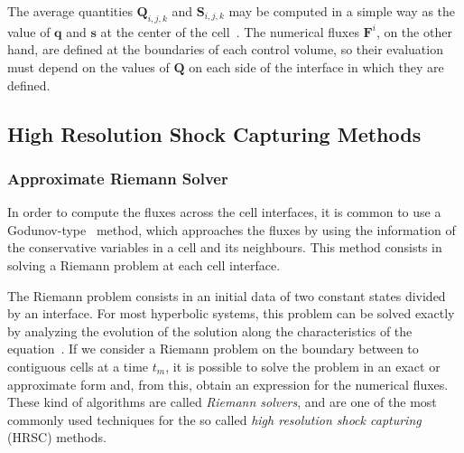 
The average quantities $\mathbf{Q}_{i,j,k}$ and $\mathbf{S}_{i,j,k}$ may be computed in a simple way as the value of $\mathbf{q}$ and $\mathbf{s}$ at the center of the cell~\citep{leveque2002}. The numerical fluxes $\mathbf{{F}}^i$, on the other hand, are defined at the boundaries of each control volume, so their evaluation must depend on the values of $\mathbf{Q}$ on each side of the interface in which they are defined.


\subsection{High Resolution Shock Capturing Methods}
\label{susec:HRSC}


\subsubsection{Approximate Riemann Solver}
\label{subsubsec:riemann_solver}

In order to compute the fluxes across the cell interfaces, it is common to use a Godunov-type~\citep{godunov1959} method, which approaches the fluxes by using the information of the conservative variables in a cell and its neighbours. This method consists in solving a Riemann problem at each cell interface.

The Riemann problem consists in an initial data of two constant states divided by an interface. For most hyperbolic systems, this problem can be solved exactly by analyzing the evolution of the solution along the characteristics of the equation~\citep[see][]{toro2009}. If we consider a Riemann problem on the boundary between to contiguous cells at a time $t_m$, it is possible to solve the problem in an exact or approximate form and, from this, obtain an expression for the numerical fluxes. These kind of algorithms are called \textit{Riemann solvers}, and are one of the most commonly used techniques for the so called \textit{high resolution shock capturing} (HRSC) methods.

